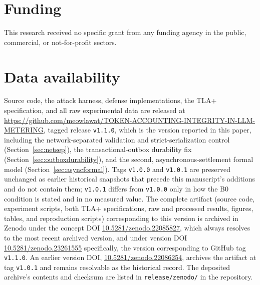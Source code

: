 \documentclass[manuscript,review]{acmart}
\begin{document}
\section*{Funding}
This research received no specific grant from any funding agency in the public,
commercial, or not-for-profit sectors.

\section*{Data availability}
Source code, the attack harness, defense implementations, the TLA+ specification, and all
raw experimental data are released at
\url{https://github.com/meowlawat/TOKEN-ACCOUNTING-INTEGRITY-IN-LLM-METERING}, tagged
release \texttt{v1.1.0}, which is the version reported in this paper, including the
network-separated validation and strict-serialization control (Section~\ref{sec:netsep}),
the transactional-outbox durability fix (Section~\ref{sec:outboxdurability}), and the
second, asynchronous-settlement formal model (Section~\ref{sec:asyncformal}). Tags
\texttt{v1.0.0} and
\texttt{v1.0.1} are preserved unchanged as earlier historical snapshots that precede this
manuscript's additions and do not contain them; \texttt{v1.0.1} differs from
\texttt{v1.0.0} only in how the B0 condition is stated and in no measured value. The
complete artifact (source code, experiment scripts, both TLA+ specifications, raw and
processed results, figures, tables, and reproduction scripts) corresponding to this
version is archived in Zenodo under the concept DOI
\href{https://doi.org/10.5281/zenodo.22085827}{10.5281/zenodo.22085827}, which always
resolves to the most recent archived version, and under version DOI
\href{https://doi.org/10.5281/zenodo.23261555}{10.5281/zenodo.23261555} specifically, the
version corresponding to GitHub tag \texttt{v1.1.0}. An earlier version DOI,
\href{https://doi.org/10.5281/zenodo.22086254}{10.5281/zenodo.22086254}, archives the
artifact at tag \texttt{v1.0.1} and remains resolvable as the historical record. The
deposited archive's contents and checksum are listed in \texttt{release/zenodo/} in the
repository.



\end{document}

